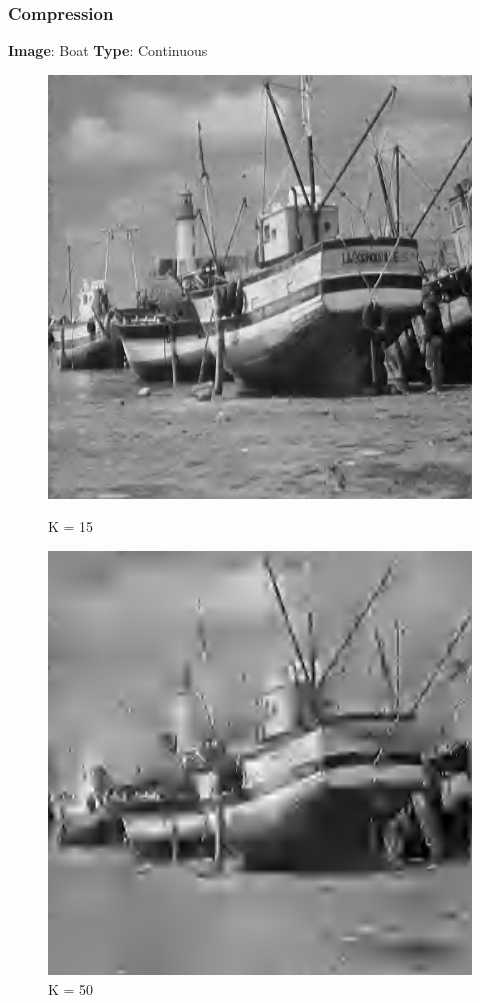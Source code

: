 \documentclass{article}
\begin{document}
\pagebreak
\subsubsection*{Compression}

    \textbf{Image}: Boat  \textbf{Type}: Continuous\\
    \begin{figure}[!htb]
      \includegraphics[scale=0.4]{3/.report/compression/3/15.png}
      \caption{K = 15}
    \endminipage \hfill
      \includegraphics[scale=.4]{./compression/3/50.png}
      \caption{K = 50}
    \endminipage
    \end{figure}
    
\end{document}
